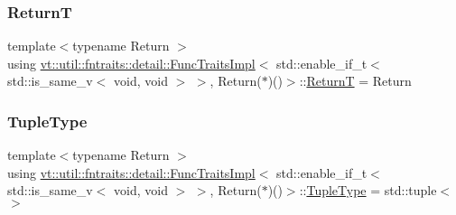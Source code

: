 \subsubsection{\texorpdfstring{ReturnT}{ReturnT}}
{\footnotesize\ttfamily template$<$typename Return $>$ \\
using \hyperlink{structvt_1_1util_1_1fntraits_1_1detail_1_1_func_traits_impl}{vt\+::util\+::fntraits\+::detail\+::\+Func\+Traits\+Impl}$<$ std\+::enable\+\_\+if\+\_\+t$<$ std\+::is\+\_\+same\+\_\+v$<$ void, void $>$ $>$, Return($\ast$)()$>$\+::\hyperlink{structvt_1_1util_1_1fntraits_1_1detail_1_1_func_traits_impl_3_01std_1_1enable__if__t_3_01std_1_1ad5feb26a13a77ffcef5dc070c332fb3_a88453b0f708f1b1ec93369ee9aa75f86}{ReturnT} =  Return}

\mbox{\label{structvt_1_1util_1_1fntraits_1_1detail_1_1_func_traits_impl_3_01std_1_1enable__if__t_3_01std_1_1ad5feb26a13a77ffcef5dc070c332fb3_a6ce8162e330b061d450abbd514cfbf01}} 
\subsubsection{\texorpdfstring{Tuple\+Type}{TupleType}}
{\footnotesize\ttfamily template$<$typename Return $>$ \\
using \hyperlink{structvt_1_1util_1_1fntraits_1_1detail_1_1_func_traits_impl}{vt\+::util\+::fntraits\+::detail\+::\+Func\+Traits\+Impl}$<$ std\+::enable\+\_\+if\+\_\+t$<$ std\+::is\+\_\+same\+\_\+v$<$ void, void $>$ $>$, Return($\ast$)()$>$\+::\hyperlink{structvt_1_1util_1_1fntraits_1_1detail_1_1_func_traits_impl_3_01std_1_1enable__if__t_3_01std_1_1ad5feb26a13a77ffcef5dc070c332fb3_a6ce8162e330b061d450abbd514cfbf01}{Tuple\+Type} =  std\+::tuple$<$$>$}



